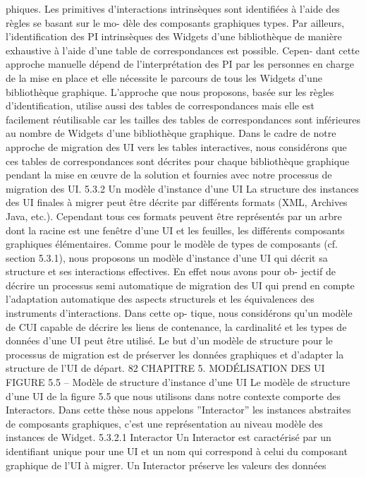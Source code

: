 \documentclass{article}
\begin{document}
phiques.
Les primitives d’interactions intrinsèques sont identiﬁées à l’aide des règles se basant sur le mo-
dèle des composants graphiques types. Par ailleurs, l’identiﬁcation des PI intrinsèques des Widgets
d’une bibliothèque de manière exhaustive à l’aide d’une table de correspondances est possible. Cepen-
dant cette approche manuelle dépend de l’interprétation des PI par les personnes en charge de la mise
en place et elle nécessite le parcours de tous les Widgets d’une bibliothèque graphique. L’approche que
nous proposons, basée sur les règles d’identiﬁcation, utilise aussi des tables de correspondances mais
elle est facilement réutilisable car les tailles des tables de correspondances sont inférieures au nombre
de Widgets d’une bibliothèque graphique. Dans le cadre de notre approche de migration des UI vers
les tables interactives, nous considérons que ces tables de correspondances sont décrites pour chaque
bibliothèque graphique pendant la mise en œuvre de la solution et fournies avec notre processus de
migration des UI.
5.3.2
Un modèle d’instance d’une UI
La structure des instances des UI ﬁnales à migrer peut être décrite par différents formats (XML,
Archives Java, etc.). Cependant tous ces formats peuvent être représentés par un arbre dont la racine
est une fenêtre d’une UI et les feuilles, les différents composants graphiques élémentaires.
Comme pour le modèle de types de composants (cf. section 5.3.1), nous proposons un modèle
d’instance d’une UI qui décrit sa structure et ses interactions effectives. En effet nous avons pour ob-
jectif de décrire un processus semi automatique de migration des UI qui prend en compte l’adaptation
automatique des aspects structurels et les équivalences des instruments d’interactions. Dans cette op-
tique, nous considérons qu’un modèle de CUI capable de décrire les liens de contenance, la cardinalité
et les types de données d’une UI peut être utilisé. Le but d’un modèle de structure pour le processus
de migration est de préserver les données graphiques et d’adapter la structure de l’UI de départ.
82
CHAPITRE 5. MODÉLISATION DES UI
FIGURE 5.5 – Modèle de structure d’instance d’une UI
Le modèle de structure d’une UI de la ﬁgure 5.5 que nous utilisons dans notre contexte comporte
des Interactors. Dans cette thèse nous appelons ”Interactor” les instances abstraites de composants
graphiques, c’est une représentation au niveau modèle des instances de Widget.
5.3.2.1
Interactor
Un Interactor est caractérisé par un identiﬁant unique pour une UI et un nom qui correspond
à celui du composant graphique de l’UI à migrer. Un Interactor préserve les valeurs des données
\end{document}
